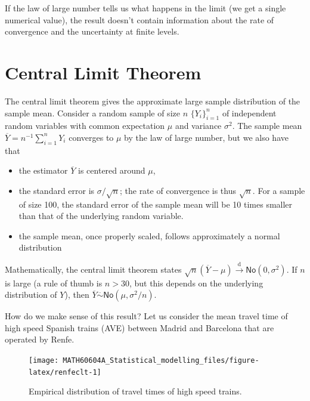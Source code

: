 \documentclass[
  11pt,
  letterpaper,
]{book}
\providecommand{\tightlist}{%
  \setlength{\itemsep}{0pt}\setlength{\parskip}{0pt}}
\theoremstyle{definition}
\theoremstyle{definition}
\theoremstyle{definition}
\theoremstyle{definition}
\theoremstyle{remark}
\begin{document}
If the law of large number tells us what happens in the limit (we get a single numerical value), the result doesn't contain information about the rate of convergence and the uncertainty at finite levels.

\hypertarget{CLT}{%
\section{Central Limit Theorem}\label{CLT}}

The central limit theorem gives the approximate large sample distribution of the sample mean. Consider a random sample of size \(n\) \(\{Y_i\}_{i=1}^n\) of independent random variables with common expectation \(\mu\) and variance \(\sigma^2\). The sample mean \(\overline{Y} = n^{-1}\sum_{i=1}^n Y_i\) converges to \(\mu\) by the law of large number, but we also have that

\begin{itemize}
\tightlist
\item
  the estimator \(\overline{Y}\) is centered around \(\mu\),
\item
  the standard error is \(\sigma/\sqrt{n}\); the rate of convergence is thus \(\sqrt{n}\). For a sample of size 100, the standard error of the sample mean will be 10 times smaller than that of the underlying random variable.
\item
  the sample mean, once properly scaled, follows approximately a normal distribution
\end{itemize}

Mathematically, the central limit theorem states \(\sqrt{n}(\overline{Y}-\mu) \stackrel{\mathrm{d}}{\rightarrow} \mathsf{No}(0, \sigma^2)\). If \(n\) is large (a rule of thumb is \(n>30\), but this depends on the underlying distribution of \(Y\)), then \(\overline{Y} \stackrel{\cdot}{\sim} \mathsf{No}(\mu, \sigma^2/n)\).

How do we make sense of this result? Let us consider the mean travel time of high speed Spanish trains (AVE) between Madrid and Barcelona that are operated by Renfe.

\begin{figure}

{\centering \texttt{[image: MATH60604A\_Statistical\_modelling\_files/figure-latex/renfeclt-1]} 

}

\caption{Empirical distribution of travel times of high speed trains.}\label{fig:renfeclt}
\end{figure}
\end{document}
